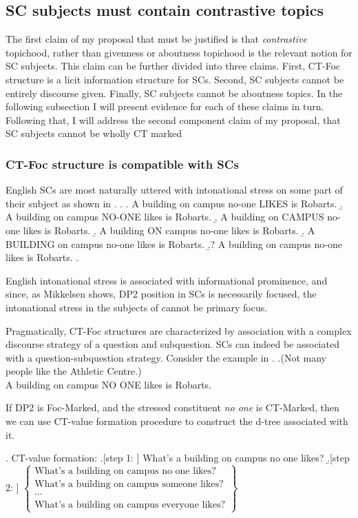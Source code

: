 \documentclass[GPFinal]{subfiles}
\begin{document}
\subsection{SC subjects must contain contrastive topics}
The first claim of my proposal that must be justified is that \textit{contrastive} topichood, rather than givenness or aboutness topichood is the relevant notion for SC subjects.
This claim can be further divided into three claims.
First, CT-Foc structure is a licit information structure for SCs.
Second, SC subjects cannot be entirely discourse given.
Finally, SC subjects cannot be aboutness topics.
In the following subsection I will present evidence for each of these claims in turn.
Following that, I will address the second component claim of my proposal, that SC subjects cannot be wholly CT marked
\subsubsection{CT-Foc structure is compatible with SCs}
English SCs are most naturally uttered with intonational stress on some part of their subject as shown in \Next.
\ex.
\a. A building on campus no-one LIKES is Robarts.
\b. A building on campus NO-ONE likes is Robarts.
\b. A building on CAMPUS no-one likes is Robarts.
\b. A building ON campus no-one likes is Robarts.
\b. A BUILDING on campus no-one likes is Robarts.
\b.? A building on campus no-one likes is Robarts.
\z.

English intonational stress is associated with informational prominence, and since, as Mikkelsen shows, DP2 position in SCs is necessarily focused, the intonational stress in the subjects of \Last cannot be primary focus.

Pragmatically, CT-Foc structures are characterized by association with a complex discourse strategy of a question and subquestion.
SCs can indeed be associated with a question-subquestion strategy.
Consider the example in \Next.
\ex.(Not many people like the Athletic Centre.)\\
A building on campus NO ONE likes is Robarts.

If DP2 is Foc-Marked, and the stressed constituent \textit{no one} is CT-Marked, then we can use  CT-value formation procedure to construct the d-tree associated with it.

\ex. CT-value formation:
\a.[step 1: ] What's a building on campus no one likes?
\b.[step 2: ] $
\begin{Bmatrix}
  \text{What's a building on campus no one likes?}\\
  \text{What's a building on campus  someone likes?}\\
  \cdots\\
  \text{What's a building on campus  everyone likes?}
\end{Bmatrix}
$
\end{document}
